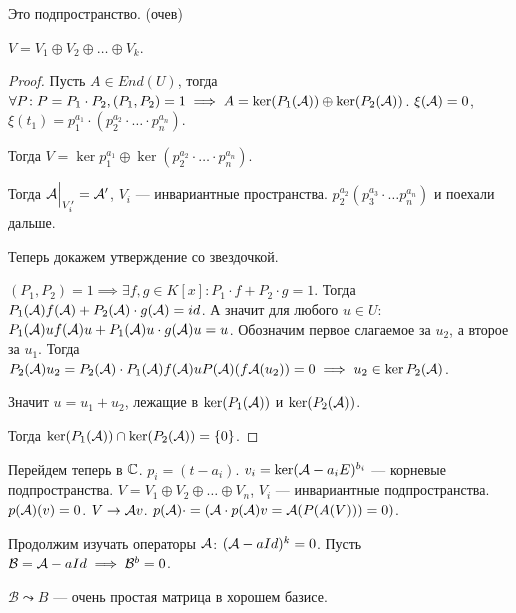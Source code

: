 \begin{remark}
    Это подпространство. (очев)
\end{remark}

\begin{theorem}
    $V = V_1 \oplus V_2 \oplus \ldots \oplus V_k$.
\end{theorem}
\begin{proof}
    Пусть $A \in End(U)$, тогда $\forall P\!: P = P_1 \cdot P_2, (P_1, P_2) = 1 \implies A = \ker(P_1(\mathcal{A})) \oplus \ker(P_2(\mathcal{A}))$. $\xi(\mathcal{A}) = 0$, $\xi(t_1) = p_1^{a_1} \cdot (p_2^{a_2} \cdot \ldots \cdot p_n^{a_n})$. 

    Тогда $V = \ker p_1^{a_1} \oplus \ker(p_2^{a_2} \cdot \ldots \cdot p_n^{a_n})$. 

    Тогда $\mathcal{A}\Big|_{V'_i} = \mathcal{A}'$,  $V_i$ --- инвариантные пространства.  $p_2^{a_2} (p_3^{a_3} \cdot \ldots p_n^{a_n})$ и поехали дальше.

    Теперь докажем утверждение со звездочкой.

    $(P_1, P_2) = 1 \implies \exists f, g \in K[x]\!: P_1 \cdot f + P_2 \cdot g = 1$. Тогда $P_1(\mathcal{A}) f(\mathcal{A}) + P_2(\mathcal{A})\cdot g(\mathcal{A}) = id$. А значит для любого $u \in U\!:$  $P_1(\mathcal{A})u f(\mathcal{A})u + P_1(\mathcal{A})u \cdot g(\mathcal{A})u = u$. Обозначим первое слагаемое за $u_2$, а второе за $u_1$. Тогда $P_2(\mathcal{A}) u_2 = P_2(\mathcal{A}) \cdot P_1(\mathcal{A}) f(\mathcal{A})u  P(\mathcal{A})(f \mathcal{A}(u_2)) = 0 \implies u_2 \in \ker P_2(\mathcal{A})$. 

    Значит $u = u_1 + u_2$, лежащие в $\ker(P_1(\mathcal{A}))$ и $\ker(P_2(\mathcal{A}))$.

    Тогда $\ker(P_1(\mathcal{A})) \cap \ker(P_2(\mathcal{A})) = \{0\}$.
\end{proof}

Перейдем теперь в $\mathbb{C}$.  $p_i = (t-a_i)$.  $v_i = \ker(\mathcal{A} - a_iE)^{b_i}$ --- корневые подпространства. $V = V_1 \oplus V_2 \oplus \ldots \oplus V_n$, $V_i$ --- инвариантные подпространства.  $p(\mathcal{A})(v) = 0$.  $V \to \mathcal{A} v$.  $p(\mathcal{A}) \cdot = (\mathcal{A} \cdot p(\mathcal{A})v = \mathcal{A}(P(A(V))) = 0)$. 

Продолжим изучать операторы $\mathcal{A}$: $(\mathcal{A} - aId)^k = 0$. Пусть  $\mathcal{B} = \mathcal{A} - aId \implies \mathcal{B}^b = 0$.

$\mathcal{B} \leadsto B$ --- очень простая матрица в хорошем базисе. 

